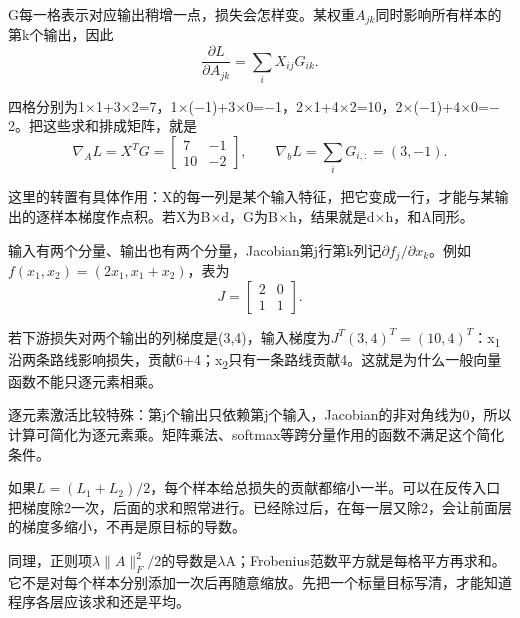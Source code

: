 G每一格表示对应输出稍增一点，损失会怎样变。某权重\(A_{jk}\)同时影响所有样本的第k个输出，因此
\[
\frac{\partial L}{\partial A_{jk}}=\sum_i X_{ij}G_{ik}.\tag{M.39}
\]


四格分别为1\ensuremath{\times}1+3\ensuremath{\times}2=7，1\ensuremath{\times}(\ensuremath{-}1)+3\ensuremath{\times}0=\ensuremath{-}1，2\ensuremath{\times}1+4\ensuremath{\times}2=10，2\ensuremath{\times}(\ensuremath{-}1)+4\ensuremath{\times}0=\ensuremath{-}2。把这些求和排成矩阵，就是
\[
\nabla_A L=X^TG=\begin{bmatrix}7&-1\\10&-2\end{bmatrix},\qquad
\nabla_b L=\sum_iG_{i,:}=(3,-1).\tag{M.40}
\]


这里的转置有具体作用：X的每一列是某个输入特征，把它变成一行，才能与某输出的逐样本梯度作点积。若X为B\ensuremath{\times}d，G为B\ensuremath{\times}h，结果就是d\ensuremath{\times}h，和A同形。





输入有两个分量、输出也有两个分量，Jacobian第j行第k列记\(\partial f_j/\partial x_k\)。例如\(f(x_1,x_2)=(2x_1,x_1+x_2)\)，表为
\[
J=\begin{bmatrix}2&0\\1&1\end{bmatrix}.\tag{M.41}
\]


若下游损失对两个输出的列梯度是(3,4)，输入梯度为\(J^T(3,4)^T=(10,4)^T\)：x\textsubscript{1}沿两条路线影响损失，贡献6+4；x\textsubscript{2}只有一条路线贡献4。这就是为什么一般向量函数不能只逐元素相乘。


逐元素激活比较特殊：第j个输出只依赖第j个输入，Jacobian的非对角线为0，所以计算可简化为逐元素乘。矩阵乘法、softmax等跨分量作用的函数不满足这个简化条件。





如果\(L=(L_1+L_2)/2\)，每个样本给总损失的贡献都缩小一半。可以在反传入口把梯度除2一次，后面的求和照常进行。已经除过后，在每一层又除2，会让前面层的梯度多缩小，不再是原目标的导数。


同理，正则项\(\lambda\|A\|_F^2/2\)的导数是\ensuremath{\lambda}A；Frobenius范数平方就是每格平方再求和。它不是对每个样本分别添加一次后再随意缩放。先把一个标量目标写清，才能知道程序各层应该求和还是平均。



